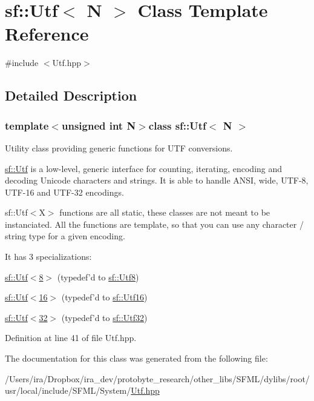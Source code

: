 \hypertarget{classsf_1_1_utf}{\section{sf\-:\-:Utf$<$ N $>$ Class Template Reference}
\label{classsf_1_1_utf}
}


{\ttfamily \#include $<$Utf.\-hpp$>$}



\subsection{Detailed Description}
\subsubsection*{template$<$unsigned int N$>$class sf\-::\-Utf$<$ N $>$}

Utility class providing generic functions for U\-T\-F conversions.

\hyperlink{classsf_1_1_utf}{sf\-::\-Utf} is a low-\/level, generic interface for counting, iterating, encoding and decoding Unicode characters and strings. It is able to handle A\-N\-S\-I, wide, U\-T\-F-\/8, U\-T\-F-\/16 and U\-T\-F-\/32 encodings.

sf\-::\-Utf$<$\-X$>$ functions are all static, these classes are not meant to be instanciated. All the functions are template, so that you can use any character / string type for a given encoding.

It has 3 specializations\-: \begin{DoxyItemize}
\item \hyperlink{classsf_1_1_utf_3_018_01_4}{sf\-::\-Utf$<$8$>$} (typedef'd to \hyperlink{namespacesf_ab78b7f576a82034d14eab92becc15301}{sf\-::\-Utf8}) \item \hyperlink{classsf_1_1_utf_3_0116_01_4}{sf\-::\-Utf$<$16$>$} (typedef'd to \hyperlink{namespacesf_ae30b6ea05a1723d608853ebc3043e53d}{sf\-::\-Utf16}) \item \hyperlink{classsf_1_1_utf_3_0132_01_4}{sf\-::\-Utf$<$32$>$} (typedef'd to \hyperlink{namespacesf_a51a40f697607908d2e9f58e67f4c89a3}{sf\-::\-Utf32}) \end{DoxyItemize}


Definition at line 41 of file Utf.\-hpp.



The documentation for this class was generated from the following file\-:\begin{DoxyCompactItemize}
\item 
/\-Users/ira/\-Dropbox/ira\-\_\-dev/protobyte\-\_\-research/other\-\_\-libs/\-S\-F\-M\-L/dylibs/root/usr/local/include/\-S\-F\-M\-L/\-System/\hyperlink{_utf_8hpp}{Utf.\-hpp}\end{DoxyCompactItemize}
